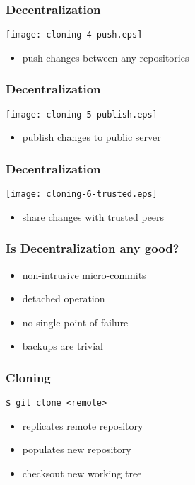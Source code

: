 \documentclass[english]{beamer}
\newcommand{\CMD}[1]{%
\texttt{\textcolor{code-blue}{#1}}%
}
\newcommand{\green}[1]{%
\textcolor{code-green}{#1}%
}
\begin{document}
\begin{frame}
\frametitle{Decentralization}
\texttt{[image: cloning-4-push.eps]}
\begin{itemize}
        \item push changes between any repositories
\end{itemize}
\end{frame}

\begin{frame}
\frametitle{Decentralization}
\texttt{[image: cloning-5-publish.eps]}
\begin{itemize}
        \item publish changes to public server
\end{itemize}
\end{frame}

\begin{frame}
\frametitle{Decentralization}
\texttt{[image: cloning-6-trusted.eps]}
\begin{itemize}
        \item share changes with trusted peers
\end{itemize}
\end{frame}

\begin{frame}
\frametitle{Is Decentralization any good?}

\begin{itemize}
        \item non-intrusive micro-commits
        \item detached operation
        \item no single point of failure
        \item backups are trivial
\end{itemize}
\end{frame}

\begin{frame}
\frametitle{Cloning}

\CMD{\$ git clone <remote>} \\
\begin{itemize}
        \item replicates \green{remote} repository
        \item populates new repository
        \item checksout new working tree
\end{itemize}
\end{frame}
\end{document}
